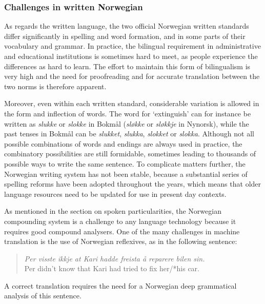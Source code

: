 \begin{multicols}{2}
\subsubsection{Challenges in written Norwegian}

As regards the written language, the two official Norwegian written standards differ significantly in spelling and word formation, and in some parts of their vocabulary and grammar. 
In practice, the bilingual requirement in administrative and educational institutions is sometimes hard to meet, as people experience the differences as hard to learn. 
The effort to maintain this form of bilingualism is very high and the need for proofreading and for accurate translation between the two norms is therefore apparent.


Moreover, even within each written standard, considerable variation is allowed in the form and inflection of words. 
The word for `extinguish' can for instance be written as \textit{slukke} or \textit{slokke} in Bokmål (\textit{sløkke} or \textit{sløkkje} in Nynorsk), while the past tenses in Bokmål can be \textit{slukket}, \textit{slukka}, \textit{slokket} or \textit{slokka}. 
Although not all possible combinations of words and endings are always used in practice, the combinatory possibilities are still formidable, sometimes leading to thousands of possible ways to write the same sentence. 
To complicate matters further, the Norwegian writing system has not been stable, because a substantial series of spelling reforms have been adopted throughout the years, which means that older language resources need to be updated for use in present day contexts.

As mentioned in the section on spoken particularities, the Norwegian compounding system is a challenge to any language technology because it requires good compound analysers.
One of the many challenges in machine translation is the use of Norwegian reflexives, as in the following sentence:

\begin{quote}
	\emph{Per visste ikkje at Kari hadde freista å reparere bilen \emph{sin}.}\\
	Per didn’t know that Kari had tried to fix her/*his car.
\end{quote}

A correct translation requires the need for a Norwegian deep grammatical analysis of this sentence.


\end{multicols}
